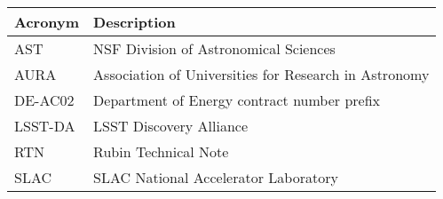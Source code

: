 \addtocounter{table}{-1}
\begin{longtable}{p{}p{}}\hline
\textbf{Acronym} & \textbf{Description}  \\\hline

AST & NSF Division of Astronomical Sciences \\\hline
AURA & Association of Universities for Research in Astronomy \\\hline
DE-AC02 & Department of Energy contract number prefix \\\hline
LSST-DA & LSST Discovery Alliance \\\hline
RTN & Rubin Technical Note \\\hline
SLAC & SLAC National Accelerator Laboratory \\\hline
\end{longtable}
